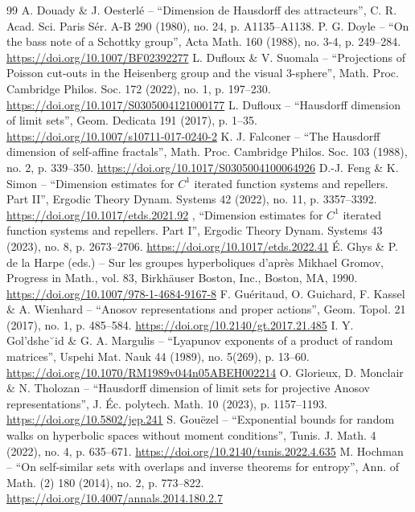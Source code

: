 \documentclass[10pt,a4paper]{amsart}
\begin{document}
\begin{thebibliography}{99}
 A. Douady \& J. Oesterlé – “Dimension de Hausdorff des attracteurs”, C. R. Acad. Sci. Paris Sér. A-B 290 (1980), no. 24, p. A1135–A1138. 
 P. G. Doyle – “On the bass note of a Schottky group”, Acta Math. 160 (1988), no. 3-4, p. 249–284. \url{https://doi.org/10.1007/BF02392277}
 L. Dufloux \& V. Suomala – “Projections of Poisson cut-outs in the Heisenberg group and the visual 3-sphere”, Math. Proc. Cambridge Philos. Soc. 172 (2022), no. 1, p. 197–230. \url{https://doi.org/10.1017/S0305004121000177}
 L. Dufloux – “Hausdorff dimension of limit sets”, Geom. Dedicata 191 (2017), p. 1–35. \url{https://doi.org/10.1007/s10711-017-0240-2}
 K. J. Falconer – “The Hausdorff dimension of self-affine fractals”, Math. Proc. Cambridge Philos. Soc. 103 (1988), no. 2, p. 339–350. \url{https://doi.org/10.1017/S0305004100064926}
 D.-J. Feng \& K. Simon – “Dimension estimates for $C^1$ iterated function systems and repellers. Part II”, Ergodic Theory Dynam. Systems 42 (2022), no. 11, p. 3357–3392. \url{https://doi.org/10.1017/etds.2021.92}
 \textemdash{}, “Dimension estimates for $C^1$ iterated function systems and repellers. Part I”, Ergodic Theory Dynam. Systems 43 (2023), no. 8, p. 2673–2706. \url{https://doi.org/10.1017/etds.2022.41}
 É. Ghys \& P. de la Harpe (eds.) – Sur les groupes hyperboliques d’après Mikhael Gromov, Progress in Math., vol. 83, Birkhäuser Boston, Inc., Boston, MA, 1990. \url{https://doi.org/10.1007/978-1-4684-9167-8}
 F. Guéritaud, O. Guichard, F. Kassel \& A. Wienhard – “Anosov representations and proper actions”, Geom. Topol. 21 (2017), no. 1, p. 485–584. \url{https://doi.org/10.2140/gt.2017.21.485}
 I. Y. Gol’dshe˘id \& G. A. Margulis – “Lyapunov exponents of a product of random matrices”, Uspehi Mat. Nauk 44 (1989), no. 5(269), p. 13–60. \url{https://doi.org/10.1070/RM1989v044n05ABEH002214}
 O. Glorieux, D. Monclair \& N. Tholozan – “Hausdorff dimension of limit sets for projective Anosov representations”, J. Éc. polytech. Math. 10 (2023), p. 1157–1193. \url{https://doi.org/10.5802/jep.241}
 S. Gouëzel – “Exponential bounds for random walks on hyperbolic spaces without moment conditions”, Tunis. J. Math. 4 (2022), no. 4, p. 635–671. \url{https://doi.org/10.2140/tunis.2022.4.635}
 M. Hochman – “On self-similar sets with overlaps and inverse theorems for entropy”, Ann. of Math. (2) 180 (2014), no. 2, p. 773–822. \url{https://doi.org/10.4007/annals.2014.180.2.7}

\end{thebibliography}
\end{document}
